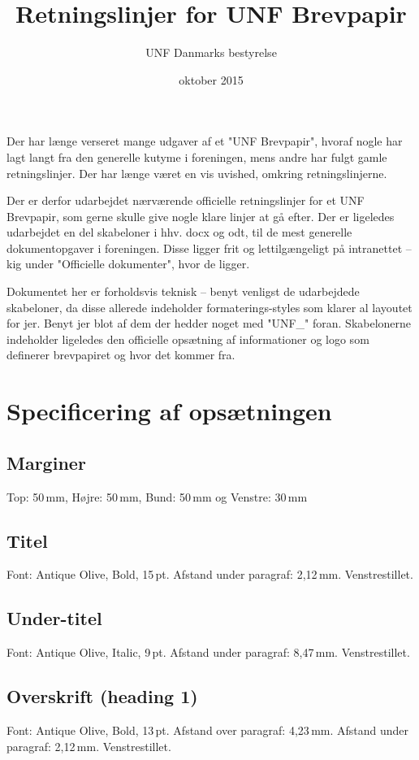 \documentclass[danmark]{UNF}
\title{Retningslinjer for UNF Brevpapir}
\author{UNF Danmarks bestyrelse}
\date{oktober 2015}
\begin{document}
\maketitle

Der har længe verseret mange udgaver af et "UNF Brevpapir",
hvoraf nogle har lagt langt fra den generelle kutyme i foreningen,
mens andre har fulgt gamle retningslinjer. Der har længe været en vis uvished,
omkring retningslinjerne.

Der er derfor udarbejdet nærværende officielle retningslinjer for et UNF Brevpapir,
som gerne skulle give nogle klare linjer at gå efter.
Der er ligeledes udarbejdet en del skabeloner i hhv. docx og odt,
til de mest generelle dokumentopgaver i foreningen.
Disse ligger frit og lettilgængeligt på intranettet -- kig under "Officielle dokumenter", 
hvor de ligger.

Dokumentet her er forholdsvis teknisk -- benyt venligst de udarbejdede skabeloner, 
da disse allerede indeholder formaterings-styles som klarer al layoutet for jer.
Benyt jer blot af dem der hedder noget med "UNF\_" foran.
Skabelonerne indeholder ligeledes den officielle opsætning af informationer
og logo som definerer brevpapiret og hvor det kommer fra.

\section{Specificering af opsætningen}

\subsection{Marginer}
Top: 50\,mm, Højre: 50\,mm, Bund: 50\,mm og Venstre: 30\,mm

\subsection{Titel}
Font: Antique Olive, Bold, 15\,pt. Afstand under paragraf: 2,12\,mm. Venstrestillet.

\subsection{Under-titel}
Font: Antique Olive, Italic, 9\,pt. Afstand under paragraf: 8,47\,mm. Venstrestillet.

\subsection{Overskrift (heading 1)}
Font: Antique Olive, Bold, 13\,pt. Afstand over paragraf: 4,23\,mm. Afstand under paragraf: 2,12\,mm. Venstrestillet.
\end{document}

